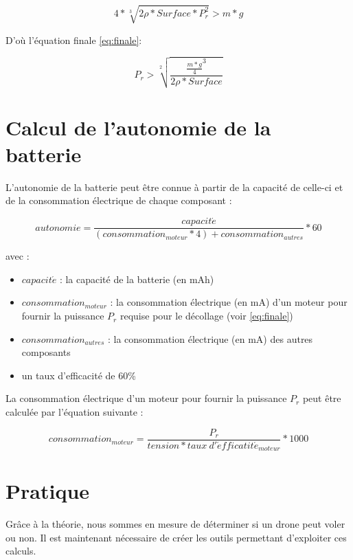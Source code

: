 \documentclass[a4paper,10pt]{report}
\begin{document}
	\begin{equation}
	  4 * \sqrt[3]{2 \rho * Surface * P_{r}^{2}} > m*g
	\end{equation}
	
	D'où l'équation finale \ref{eq:finale}:
	
	\begin{equation}
	  \label{eq:finale}
	  P_{r}  > \sqrt[2]{\frac{\frac{m*g}{4}^{3}}{2 \rho * Surface}}
	\end{equation}
	
      \section{Calcul de l'autonomie de la batterie}
	L'autonomie de la batterie peut être connue à partir de la capacité de 
celle-ci et de la consommation électrique de chaque composant :

	\begin{equation}
	  autonomie = \frac{capacit\acute{e}}{(consommation_{moteur} * 4) + 
consommation_{autres}} * 60
	\end{equation}
	
	avec :
	
	\begin{itemize}
	  \item $capacit\acute{e}$ : la capacité de la batterie (en mAh)
	  \item $consommation_{moteur}$ : la consommation électrique (en mA) 
d'un moteur pour fournir la puissance $P_{r}$ requise pour le décollage (voir 
\ref{eq:finale})
	  \item $consommation_{autres}$ : la consommation électrique (en mA) 
des autres composants
	  \item un taux d'efficacité de 60\%
	\end{itemize}
	
	La consommation électrique d'un moteur pour fournir la puissance 
$P_{r}$ peut être calculée par l'équation suivante :

	\begin{equation}
	  consommation_{moteur} = \frac{P_{r}}{tension * taux \ 
d'\acute{e}fficatit\acute{e}_{moteur}}*1000
	\end{equation}

      \section{Pratique}
	Grâce à la théorie, nous sommes en mesure de déterminer si un drone 
peut voler ou non. Il est maintenant nécessaire de créer les outils permettant 
d'exploiter ces calculs. 
\end{document}
